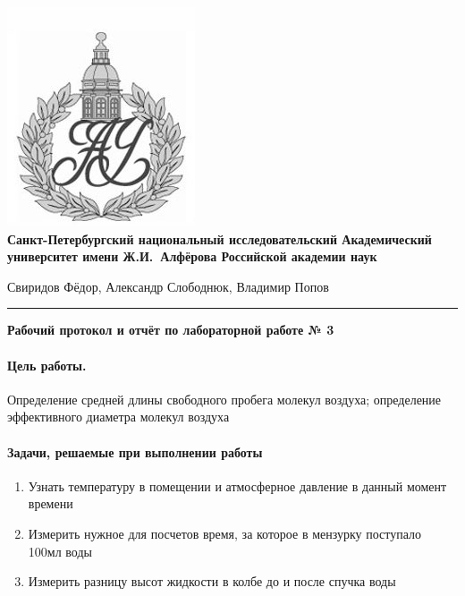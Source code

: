 \documentclass{article}
\begin{document}
\begin{center}
	\includegraphics[scale=0.25]{AU}\\
	{\Large\bfseries Санкт-Петербургский национальный исследовательский Академический университет имени Ж.И.~Алфёрова Российской академии наук}
\end{center}

\begin{center}
	Свиридов Фёдор, Александр Слободнюк, Владимир Попов
\end{center}
\rule{12cm}{0.4mm}
\begin{center}
	{\large\textbf{Рабочий протокол и отчёт по лабораторной работе № 3}}
\end{center}

\paragraph{Цель работы.}
Определение средней длины свободного пробега молекул воздуха; определение эффективного диаметра молекул воздуха

\paragraph{Задачи, решаемые при выполнении работы}
\begin{enumerate}
	\item Узнать температуру в помещении и атмосферное давление в данный момент времени
	\item Измерить нужное для посчетов время, за которое в мензурку поступало 100мл воды
	\item Измерить разницу высот жидкости в колбе до и после спучка воды
\end{enumerate}
\end{document}
